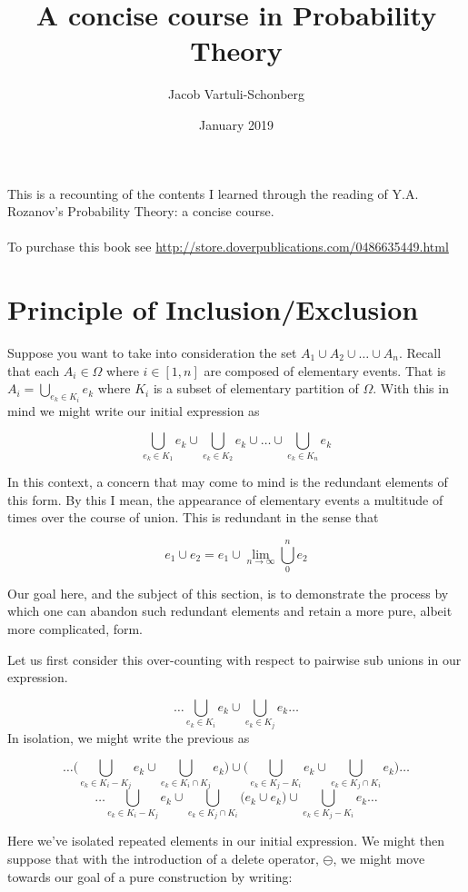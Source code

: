 \documentclass{article}
\title{A concise course in Probability Theory}
\author{Jacob Vartuli-Schonberg}
\date{January 2019}
\begin{document}
\maketitle
This is a recounting of the contents I learned through the reading of Y.A. Rozanov's Probability Theory: a concise course. \\
\\
To purchase this book see \url{http://store.doverpublications.com/0486635449.html}
\section{Principle of Inclusion/Exclusion}
Suppose you want to take into consideration the set \(A_1 \cup A_2 \cup \hdots \cup A_n\). Recall that each \(A_i \in \Omega\) where \(i \in [1, n]\) are composed of elementary events. That is \(A_i = \bigcup_{e_k \in K_i} e_k\) where \(K_i\) is a subset of elementary partition of \(\Omega\). With this in mind we might write our initial expression as

\[\bigcup_{e_k \in K_1} e_k \cup \bigcup_{e_k \in K_2} e_k \cup \hdots \cup \bigcup_{e_k \in K_n} e_k\]

In this context, a concern that may come to mind is the redundant elements of this form. By this I mean, the appearance of elementary events a multitude of times over the course of union. This is redundant in the sense that

\[e_1 \cup e_2 =  e_1 \cup \lim_{n \to \infty} \bigcup_{0}^{n} e_2\]

Our goal here, and the subject of this section, is to demonstrate the process by which one can abandon such redundant elements and retain a more pure, albeit more complicated, form.

Let us first consider this over-counting with respect to pairwise sub unions in our expression.

\[\hdots \bigcup_{e_k \in K_i} e_k \cup \bigcup_{e_k \in K_j} e_k \hdots\]
In isolation, we might write the previous as

\[\hdots
  \Bigg( \bigcup_{e_k \in K_i - K_j} e_k \cup \bigcup_{e_k \in K_i \cap K_j} e_k \Bigg)
  \cup
  \Bigg( \bigcup_{e_k \in K_j - K_i} e_k \cup \bigcup_{e_k \in K_j \cap K_i} e_k \Bigg)
  \hdots\]
\[\hdots
  \bigcup_{e_k \in K_i - K_j} e_k \cup \bigcup_{e_k \in K_j \cap K_i} \big(e_k \cup e_k\big) \cup \bigcup_{e_k \in K_j - K_i} e_k
  \hdots\]

Here we've isolated repeated elements in our initial expression. We might then suppose that with the introduction of a delete operator, \(\ominus\), we might move towards our goal of a pure construction by writing:
\end{document}
